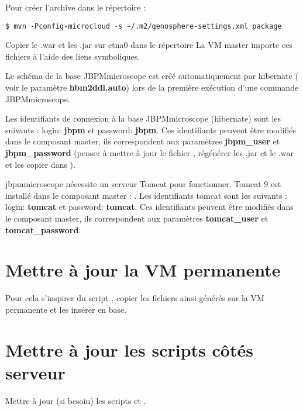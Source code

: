Pour créer l'archive  dans le répertoire  :
\begin{lstlisting}[style=bash]
$ mvn -Pconfig-microcloud -s ~/.m2/genosphere-settings.xml package
\end{lstlisting}
\bigskip

Copier le .war et les .jar sur etna0 dans le répertoire 
La VM master importe ces fichiers à l’aide des liens symboliques.
\newline

Le schéma de la base JBPMmicroscope est créé automatiquement par hibernate ( voir le paramètre \textbf{hbm2ddl.auto}) lors de la première exécution d'une commande JBPMmicroscope.
\newline

Les identifiants de connexion à la base JBPMmicroscope (hibernate) sont les suivants :
login: \textbf{jbpm} et password: \textbf{jbpm}. Ces identifiants peuvent être modifiés dans le composant master, ils correspondent aux paramètres \textbf{jbpm\_user} et \textbf{jbpm\_password} (penser à mettre à jour le fichier , régénérer les .jar et le .war et les copier dans ).
\newline

jbpmmicroscope nécessite un serveur Tomcat pour fonctionner. Tomcat 9 est installé dans le composant master : . Les identifiants tomcat sont les suivants : login: \textbf{tomcat} et password: \textbf{tomcat}.
Ces identifiants peuvent être modifiés dans le composant master, ils correspondent aux paramètres \textbf{tomcat\_user} et \textbf{tomcat\_password}.

\section{Mettre à jour la VM permanente}
Pour cela s'inspirer du script , copier les fichiers ainsi générés sur la VM permanente et les insérer en base.

\section{Mettre à jour les scripts côtés serveur}

Mettre à jour (si besoin) les scripts  et .
